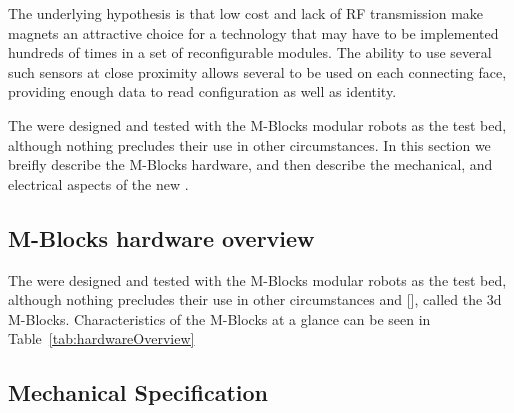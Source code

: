 The underlying hypothesis is that low cost and lack of RF transmission make magnets an attractive choice for a technology that may have to be implemented hundreds of times in a set of reconfigurable modules. The ability to use several such sensors at close proximity allows several to be used on each connecting face, providing enough data to read configuration as well as identity.





\newsavebox{\faceDiagram}
\sbox{\faceDiagram}	{
	
}

\newsavebox{\magnetDigitization}
\sbox{\magnetDigitization}	{
	
}

The \tagNamePlural were designed and tested with the M-Blocks modular robots as the test bed, although nothing precludes their use in other circumstances. In this section we breifly describe the M-Blocks hardware, and then describe the mechanical, and electrical aspects of the new \tagNamePlural.

\subsection{M-Blocks hardware overview}
\label{sec:mblocksOverview}

The \tagName were designed and tested with the M-Blocks modular robots as the test bed, although nothing precludes their use in other circumstances and [], called the 3d M-Blocks. Characteristics of the M-Blocks at a glance can be seen in Table~\ref{tab:hardwareOverview}


\subsection{\tagNamePlural Mechanical Specification}
\label{sec:tagsOverview}

